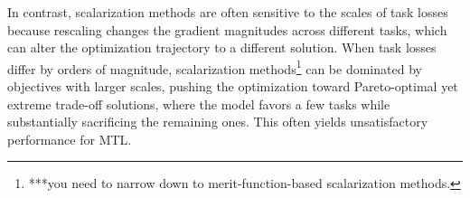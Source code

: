 \documentclass[sigconf]{acmart}
\begin{document}
In contrast, scalarization methods are often sensitive to the scales of task losses because rescaling changes the gradient magnitudes across different tasks, which can alter the optimization trajectory to a different solution.  %
When task losses differ by orders of magnitude, scalarization methods\footnote{***you need to narrow down to merit-function-based scalarization methods. } can be dominated by objectives with larger scales, pushing the optimization toward Pareto-optimal yet extreme trade-off solutions, where the model favors a few tasks while substantially sacrificing the remaining ones. This often yields unsatisfactory performance for MTL.


\end{document}
